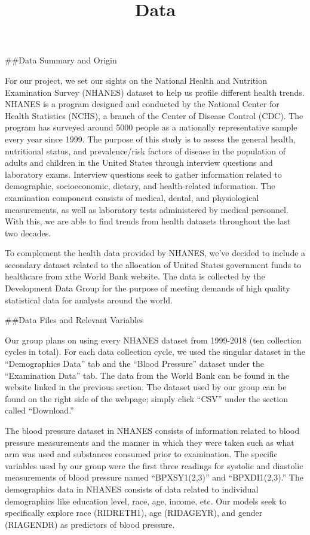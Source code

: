 \documentclass[
]{article}
\title{Data}
\author{}
\date{\vspace{-2.5em}}
\begin{document}
\maketitle

{
\setcounter{tocdepth}{3}
\tableofcontents
}
\#\#Data Summary and Origin

For our project, we set our sights on the National Health and Nutrition
Examination Survey (NHANES) dataset to help us profile different health
trends. NHANES is a program designed and conducted by the National
Center for Health Statistics (NCHS), a branch of the Center of Disease
Control (CDC). The program has surveyed around 5000 people as a
nationally representative sample every year since 1999. The purpose of
this study is to assess the general health, nutritional status, and
prevalence/risk factors of disease in the population of adults and
children in the United States through interview questions and laboratory
exams. Interview questions seek to gather information related to
demographic, socioeconomic, dietary, and health-related information. The
examination component consists of medical, dental, and physiological
measurements, as well as laboratory tests administered by medical
personnel. With this, we are able to find trends from health datasets
throughout the last two decades.

To complement the health data provided by NHANES, we've decided to
include a secondary dataset related to the allocation of United States
government funds to healthcare from xthe World Bank website. The data is
collected by the Development Data Group for the purpose of meeting
demands of high quality statistical data for analysts around the world.

\#\#Data Files and Relevant Variables

Our group plans on using every NHANES dataset from 1999-2018 (ten
collection cycles in total). For each data collection cycle, we used the
singular dataset in the ``Demographics Data'' tab and the ``Blood
Pressure'' dataset under the ``Examination Data'' tab. The data from the
World Bank can be found in the website linked in the previous section.
The dataset used by our group can be found on the right side of the
webpage; simply click ``CSV'' under the section called ``Download.''

The blood pressure dataset in NHANES consists of information related to
blood pressure measurements and the manner in which they were taken such
as what arm was used and substances consumed prior to examination. The
specific variables used by our group were the first three readings for
systolic and diastolic measurements of blood pressure named
``BPXSY1(2,3)'' and ``BPXDI1(2,3).'' The demographics data in NHANES
consists of data related to individual demographics like education
level, race, age, income, etc. Our models seek to specifically explore
race (RIDRETH1), age (RIDAGEYR), and gender (RIAGENDR) as predictors of
blood pressure.
\end{document}
